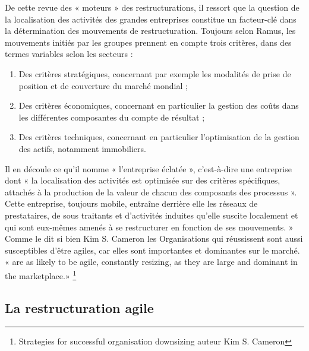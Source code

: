 \documentclass[12pt,a4paper]{article}
\begin{document}
De cette revue des « moteurs » des restructurations, il ressort que la question de la localisation des activités des grandes entreprises constitue un facteur-clé dans la détermination des mouvements de restructuration. Toujours selon Ramus, les mouvements initiés par les groupes prennent en compte trois critères, dans des termes variables selon les secteurs : \\

\begin{enumerate}
\item Des critères stratégiques, concernant par exemple les modalités de prise de position et de couverture du marché mondial ;
\item Des critères économiques, concernant en particulier la gestion des coûts dans les différentes composantes du compte de résultat ;
\item Des critères techniques, concernant en particulier l’optimisation de la gestion des actifs, notamment immobiliers.\\
\end{enumerate}

Il en découle ce qu’il nomme « l’entreprise éclatée », c’est-à-dire une entreprise dont « la localisation des activités est optimisée sur des critères spécifiques, attachés à la production de la valeur de chacun des composants des processus ». Cette entreprise, toujours mobile, entraîne derrière elle les réseaux de prestataires, de sous traitants et d’activités induites qu’elle suscite localement et qui sont eux-mêmes amenés à se restructurer en fonction de ses mouvements. »\\

Comme le dit si bien Kim S. Cameron les Organisations qui réussissent sont aussi susceptibles d'être agiles, car elles sont importantes et dominantes sur le marché. « are as likely to be agile, constantly resizing, as they are large and dominant in the marketplace.» \footnote{Strategies for successful organisation downsizing auteur Kim S. Cameron}

\subsection{La restructuration agile}

\end{document}
